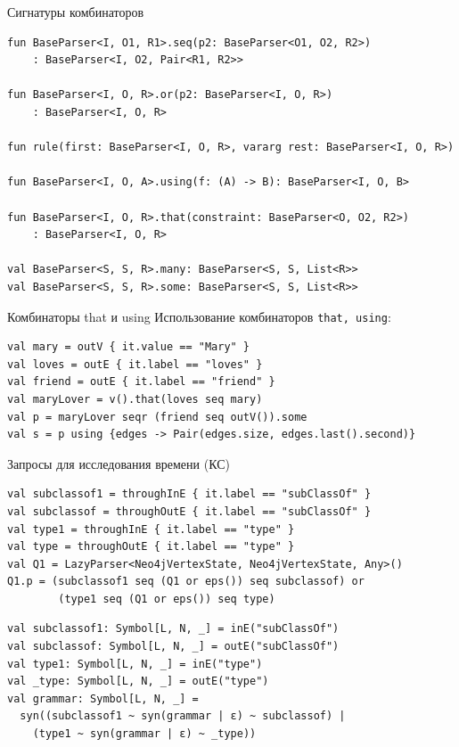 \documentclass[aspectratio=169]{beamer}
\begin{document}
\begin{frame}[fragile]{Сигнатуры комбинаторов}

  \begin{verbatim}
fun BaseParser<I, O1, R1>.seq(p2: BaseParser<O1, O2, R2>)
    : BaseParser<I, O2, Pair<R1, R2>>

fun BaseParser<I, O, R>.or(p2: BaseParser<I, O, R>)
    : BaseParser<I, O, R>

fun rule(first: BaseParser<I, O, R>, vararg rest: BaseParser<I, O, R>)

fun BaseParser<I, O, A>.using(f: (A) -> B): BaseParser<I, O, B>

fun BaseParser<I, O, R>.that(constraint: BaseParser<O, O2, R2>)
    : BaseParser<I, O, R> 
    
val BaseParser<S, S, R>.many: BaseParser<S, S, List<R>>
val BaseParser<S, S, R>.some: BaseParser<S, S, List<R>>
\end{verbatim}
\end{frame}


\begin{frame}[fragile]{Комбинаторы that и using}
  Использование комбинаторов \texttt{that, using}:
  \begin{verbatim}
val mary = outV { it.value == "Mary" }
val loves = outE { it.label == "loves" }
val friend = outE { it.label == "friend" }
val maryLover = v().that(loves seq mary)
val p = maryLover seqr (friend seq outV()).some
val s = p using {edges -> Pair(edges.size, edges.last().second)}
\end{verbatim}
\end{frame}


\begin{frame}[fragile]{Запросы для исследования времени (КС)}
  \begin{verbatim}
val subclassof1 = throughInE { it.label == "subClassOf" }
val subclassof = throughOutE { it.label == "subClassOf" }
val type1 = throughInE { it.label == "type" }
val type = throughOutE { it.label == "type" }
val Q1 = LazyParser<Neo4jVertexState, Neo4jVertexState, Any>()
Q1.p = (subclassof1 seq (Q1 or eps()) seq subclassof) or
        (type1 seq (Q1 or eps()) seq type)
\end{verbatim}
  \begin{verbatim}
val subclassof1: Symbol[L, N, _] = inE("subClassOf")
val subclassof: Symbol[L, N, _] = outE("subClassOf")
val type1: Symbol[L, N, _] = inE("type")
val _type: Symbol[L, N, _] = outE("type")
val grammar: Symbol[L, N, _] = 
  syn((subclassof1 ~ syn(grammar | ε) ~ subclassof) |
    (type1 ~ syn(grammar | ε) ~ _type))
\end{verbatim}


\end{frame}
\end{document}
